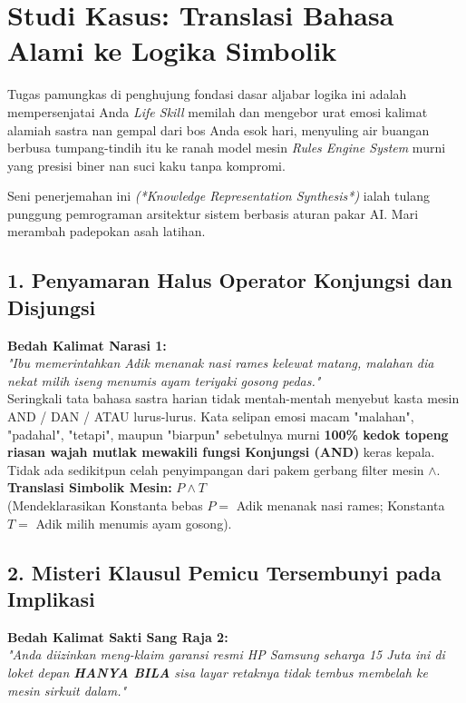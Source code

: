 \section{Studi Kasus: Translasi Bahasa Alami ke Logika Simbolik}

Tugas pamungkas di penghujung fondasi dasar aljabar logika ini adalah mempersenjatai Anda \textit{Life Skill} memilah dan mengebor urat emosi kalimat alamiah sastra nan gempal dari bos Anda esok hari, menyuling air buangan berbusa tumpang-tindih itu ke ranah model mesin \textit{Rules Engine System} murni yang presisi biner nan suci kaku tanpa kompromi. \cite{rosen2019} 

Seni penerjemahan ini \textit{(*Knowledge Representation Synthesis*)} ialah tulang punggung pemrograman arsitektur sistem berbasis aturan pakar AI. Mari merambah padepokan asah latihan.

\subsection{1. Penyamaran Halus Operator Konjungsi dan Disjungsi}

\textbf{Bedah Kalimat Narasi 1:} \\
\textit{"Ibu memerintahkan Adik menanak nasi rames kelewat matang, malahan dia nekat milih iseng menumis ayam teriyaki gosong pedas."} \\
Seringkali tata bahasa sastra harian tidak mentah-mentah menyebut kasta mesin AND / DAN / ATAU lurus-lurus. Kata selipan emosi macam "malahan", "padahal", "tetapi", maupun "biarpun" sebetulnya murni \textbf{100\% kedok topeng riasan wajah mutlak mewakili fungsi Konjungsi (AND)} keras kepala. Tidak ada sedikitpun celah penyimpangan dari pakem gerbang filter mesin $\wedge$. \\
\textbf{Translasi Simbolik Mesin:} $P \wedge T$ \\
(Mendeklarasikan Konstanta bebas $P =$ Adik menanak nasi rames; Konstanta $T =$ Adik milih menumis ayam gosong).

\subsection{2. Misteri Klausul Pemicu Tersembunyi pada Implikasi}

\textbf{Bedah Kalimat Sakti Sang Raja 2:} \\
\textit{"Anda diizinkan meng-klaim garansi resmi HP Samsung seharga 15 Juta ini di loket depan \textbf{HANYA BILA} sisa layar retaknya tidak tembus membelah ke mesin sirkuit dalam."} 

